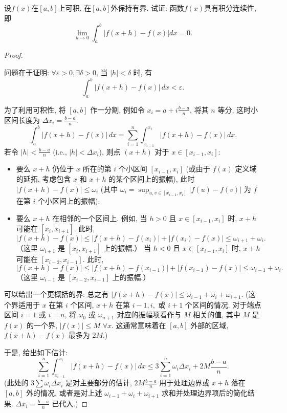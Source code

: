 \documentclass[lang=cn,newtx,10pt,scheme=chinese]{elegantbook}
\begin{document}
\begin{example}[（难难）]
设$f(x)$在$[a,b]$上可积, 在$[a,b]$外保持有界. 试证: 函数$f(x)$具有积分连续性, 即
$$ \lim\limits_{h \to 0} \int_{a}^{b} |f(x+h)-f(x)|dx = 0. $$
\end{example}
\begin{proof}

\begin{remark}
问题在于证明: $\forall \varepsilon > 0, \exists \delta > 0$, 当 $|h| < \delta$ 时, 有
$$ \int_a^b |f(x+h) - f(x)| \,dx < \varepsilon. $$
\end{remark}
为了利用可积性, 将 $[a,b]$ 作一分割, 例如令 $x_i = a + i \frac{b-a}{n}$, 将其 $n$ 等分, 这时小区间长度为 $\Delta x_i = \frac{b-a}{n}$.
$$ \int_a^b |f(x+h) - f(x)| \,dx = \sum_{i=1}^n \int_{x_{i-1}}^{x_i} |f(x+h) - f(x)| \,dx. $$
若令 $|h| < \frac{b-a}{n}$ (i.e., $|h| < \Delta x_i$), 则点 $(x+h)$ 对于 $x \in [x_{i-1}, x_i]$:
\begin{itemize}
    \item 要么 $x+h$ 仍位于 $x$ 所在的第 $i$ 个小区间 $[x_{i-1}, x_i]$ (或由于 $f(x)$ 定义域的延拓, 考虑包含 $x$ 和 $x+h$ 的某个区间上的振幅), 此时 $|f(x+h)-f(x)| \leq \omega_i$ (其中 $\omega_i = \sup_{u,v \in [x_{i-1},x_i]} |f(u)-f(v)|$ 为 $f$ 在第 $i$ 个小区间上的振幅).
    \item 要么 $x+h$ 在相邻的一个区间上. 例如, 当 $h>0$ 且 $x \in [x_{i-1}, x_i]$ 时, $x+h$ 可能在 $[x_i, x_{i+1}]$. 此时,
    $$ |f(x+h)-f(x)| \leq |f(x+h)-f(x_i)| + |f(x_i)-f(x)| \leq \omega_{i+1} + \omega_i. $$
    （这里 $\omega_{i+1}$ 是 $[x_i, x_{i+1}]$ 上的振幅.）
    当 $h<0$ 且 $x \in [x_{i-1}, x_i]$ 时, $x+h$ 可能在 $[x_{i-2}, x_{i-1}]$. 此时,
    $$ |f(x+h)-f(x)| \leq |f(x+h)-f(x_{i-1})| + |f(x_{i-1})-f(x)| \leq \omega_{i-1} + \omega_i. $$
    （这里 $\omega_{i-1}$ 是 $[x_{i-2}, x_{i-1}]$ 上的振幅.）
\end{itemize}
可以给出一个更概括的界: 总之有 $|f(x+h)-f(x)| \leq \omega_{i-1} + \omega_i + \omega_{i+1}$.
(这个界适用于 $x$ 在第 $i$ 个区间, $x+h$ 在第 $i-1, i,$ 或 $i+1$ 个区间的情况. 对于端点区间 $i=1$ 或 $i=n$, 将 $\omega_0$ 或 $\omega_{n+1}$ 对应的振幅项看作与 $M$ 相关的值, 其中 $M$ 是 $f(x)$ 的一个界, $|f(x)| \leq M$ $\forall x$. 这通常意味着在 $[a,b]$ 外部的区域, $f(x+h)-f(x)$ 最多为 $2M$.)

于是, 给出如下估计:
$$ \sum_{i=1}^n \int_{x_{i-1}}^{x_i} |f(x+h)-f(x)| \,dx \leq 3 \sum_{i=1}^n \omega_i \Delta x_i + 2M \frac{b-a}{n}. $$
(此处的 $3 \sum \omega_i \Delta x_i$ 是对主要部分的估计, $2M \frac{b-a}{n}$ 用于处理边界或 $x+h$ 落在 $[a,b]$ 外的情况, 或者是对上述 $\omega_{i-1}+\omega_i+\omega_{i+1}$ 求和并处理边界项后的简化结果. $\Delta x_i = \frac{b-a}{n}$ 已代入.)


\end{proof}
\end{document}
